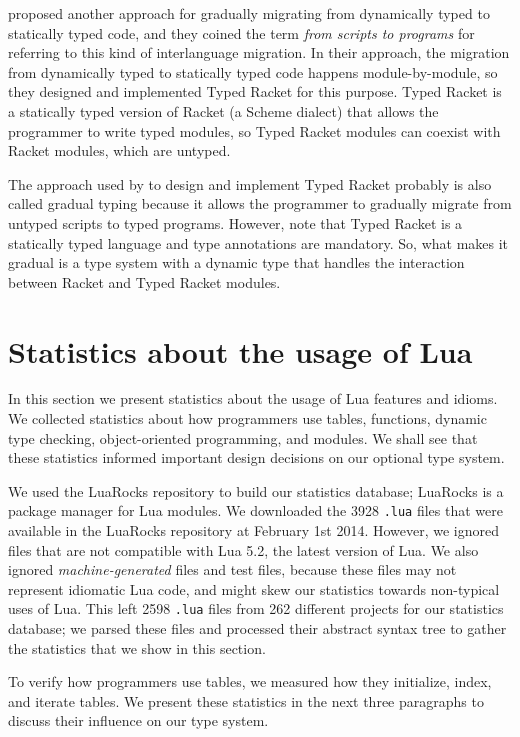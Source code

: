 \citet{tobin-hochstadt2006ims} proposed another approach for gradually
migrating from dynamically typed to statically typed code,
and they coined the term \emph{from scripts to programs} for
referring to this kind of interlanguage migration.
In their approach, the migration from dynamically typed to
statically typed code happens module-by-module, so they designed
and implemented Typed Racket \citep{tobin-hochstadt2008ts} for
this purpose.
Typed Racket is a statically typed version of Racket
(a Scheme dialect) that allows the programmer to write typed modules,
so Typed Racket modules can coexist with Racket modules,
which are untyped.

The approach used by \citet{tobin-hochstadt2008ts} to design and
implement Typed Racket probably is also called gradual typing
because it allows the programmer to gradually migrate from untyped
scripts to typed programs.
However, note that Typed Racket is a statically typed language
and type annotations are mandatory.
So, what makes it gradual is a type system with a dynamic type
that handles the interaction between Racket and Typed Racket modules.

\section{Statistics about the usage of Lua}
\label{sec:statistics}

In this section we present statistics about the usage of Lua
features and idioms.
We collected statistics about how programmers use tables, functions,
dynamic type checking, object-oriented programming, and modules.
We shall see that these statistics informed important design decisions
on our optional type system.

We used the LuaRocks repository to build our statistics database;
LuaRocks \citep{hisham2013luarocks} is a package manager for Lua
modules.
We downloaded the 3928 \texttt{.lua} files that were available in
the LuaRocks repository at February 1st 2014.
However, we ignored files that are not compatible with Lua 5.2,
the latest version of Lua.
We also ignored \emph{machine-generated} files and test files,
because these files may not represent idiomatic Lua code,
and might skew our statistics towards non-typical uses of Lua.
This left 2598 \texttt{.lua} files from 262 different projects for
our statistics database;
we parsed these files and processed their abstract syntax tree
to gather the statistics that we show in this section.

To verify how programmers use tables, we measured how they
initialize, index, and iterate tables.
We present these statistics in the next three paragraphs to discuss
their influence on our type system.

